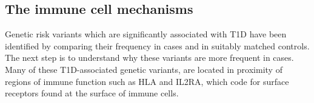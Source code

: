 
\subsection{The immune cell mechanisms}

Genetic risk variants which are significantly associated with T1D have been identified by comparing their frequency in cases and in suitably matched controls.
The next step is to understand why these variants are more frequent in cases.  
Many of these T1D-associated genetic variants, are located in proximity of regions of immune function such as HLA and IL2RA, which code for surface receptors
found at the surface of immune cells.

